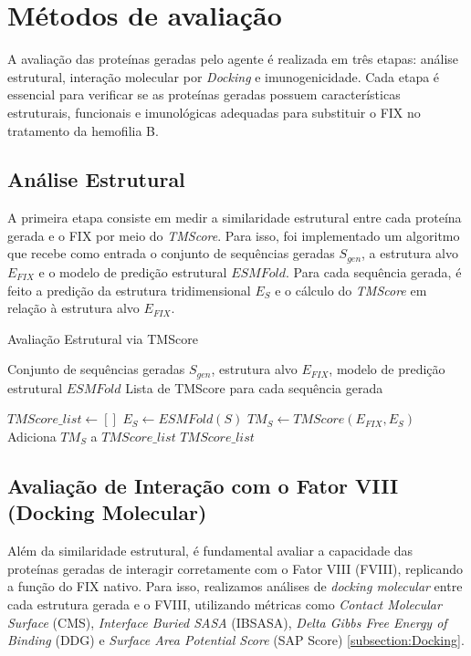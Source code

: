 \section{Métodos de avaliação}

A avaliação das proteínas geradas pelo agente é realizada em três etapas: 
análise estrutural, interação molecular por \textit{Docking} e imunogenicidade. 
Cada etapa é essencial para verificar se as proteínas geradas possuem características estruturais, 
funcionais e imunológicas adequadas para substituir o FIX no tratamento da hemofilia B.  

\subsection{Análise Estrutural}

A primeira etapa consiste em medir a similaridade estrutural entre cada proteína gerada
e o FIX por meio do \textit{TMScore}. 
Para isso, foi implementado um algoritmo que recebe como entrada o conjunto de sequências geradas $S_{gen}$,
a estrutura alvo $E_{FIX}$ e o modelo de predição estrutural $ESMFold$. 
Para cada sequência gerada, é feito a predição da estrutura tridimensional $E_S$ e o cálculo do \textit{TMScore} em
relação à estrutura alvo $E_{FIX}$.

\begin{algorithm}
  \caption{Avaliação Estrutural via TMScore}
  \label{alg:evaluation_tmscore}
  \begin{algorithmic}[1]
  \Require Conjunto de sequências geradas $S_{gen}$, 
  \State         estrutura alvo $E_{FIX}$,
  \State         modelo de predição estrutural $ESMFold$
  \Ensure Lista de TMScore para cada sequência gerada

  \State $TMScore\_list \gets []$
      \State $E_S \gets ESMFold(S)$
      \State $TM_S \gets TMScore(E_{FIX}, E_S)$
      \State Adiciona $TM_S$ a $TMScore\_list$
  \EndFor
  \State \Return $TMScore\_list$
  \end{algorithmic}
\end{algorithm}

\subsection{Avaliação de Interação com o Fator VIII (Docking Molecular)}

Além da similaridade estrutural, é fundamental avaliar a capacidade das proteínas geradas 
de interagir corretamente com o Fator VIII (FVIII), replicando a função do FIX nativo. 
Para isso, realizamos análises de \textit{docking molecular} entre cada estrutura gerada e o FVIII,
utilizando métricas como \textit{Contact Molecular Surface} (CMS), \textit{Interface Buried SASA} (IBSASA), 
\textit{Delta Gibbs Free Energy of Binding} (DDG) e \textit{Surface Area Potential Score} (SAP Score) \ref{subsection:Docking}.

